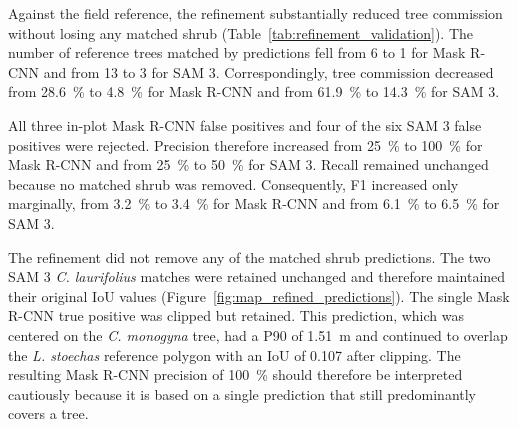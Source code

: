 \documentclass[12pt,a4paper]{article}
\begin{document}
Against the field reference, the refinement substantially reduced tree commission without losing any matched shrub (Table~\ref{tab:refinement_validation}). The number of reference trees matched by predictions fell from 6 to 1 for Mask R-CNN and from 13 to 3 for SAM 3. Correspondingly, tree commission decreased from \qty{28.6}{\percent} to \qty{4.8}{\percent} for Mask R-CNN and from \qty{61.9}{\percent} to \qty{14.3}{\percent} for SAM 3.

All three in-plot Mask R-CNN false positives and four of the six SAM 3 false positives were rejected. Precision therefore increased from \qty{25}{\percent} to \qty{100}{\percent} for Mask R-CNN and from \qty{25}{\percent} to \qty{50}{\percent} for SAM 3. Recall remained unchanged because no matched shrub was removed. Consequently, F1 increased only marginally, from \qty{3.2}{\percent} to \qty{3.4}{\percent} for Mask R-CNN and from \qty{6.1}{\percent} to \qty{6.5}{\percent} for SAM 3.

\begin{table}[ht]
    \centering
    \caption{
        Accuracy of the shrub maps against the field reference before and after LiDAR refinement.
    }
    \label{tab:refinement_validation}
\end{table}

The refinement did not remove any of the matched shrub predictions. The two SAM 3 \textit{C. laurifolius} matches were retained unchanged and therefore maintained their original IoU values (Figure~\ref{fig:map_refined_predictions}). The single Mask R-CNN true positive was clipped but retained. This prediction, which was centered on the \textit{C. monogyna} tree, had a P90 of \qty{1.51}{\metre} and continued to overlap the \textit{L. stoechas} reference polygon with an IoU of 0.107 after clipping. The resulting Mask R-CNN precision of \qty{100}{\percent} should therefore be interpreted cautiously because it is based on a single prediction that still predominantly covers a tree.
\end{document}
